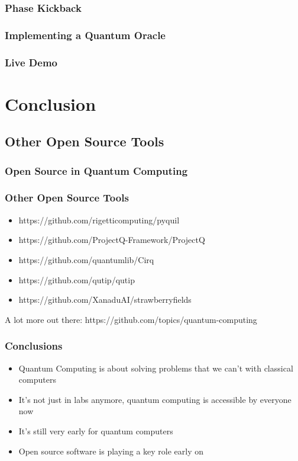 \documentclass[aspectratio=169,11pt,hyperref={colorlinks=true}]{beamer}
\begin{document}
\begin{frame}
    \frametitle{Phase Kickback}

\end{frame}

\begin{frame}
    \frametitle{Implementing a Quantum Oracle}

\end{frame}

\begin{frame}
    \frametitle{Live Demo}
\end{frame}


\section{Conclusion}
\subsection{Other Open Source Tools}
\begin{frame}
    \frametitle{Open Source in Quantum Computing}

\end{frame}

\begin{frame}
    \frametitle{Other Open Source Tools}
    \begin{itemize}
        \item https://github.com/rigetticomputing/pyquil
        \item https://github.com/ProjectQ-Framework/ProjectQ
        \item https://github.com/quantumlib/Cirq
        \item https://github.com/qutip/qutip
        \item https://github.com/XanaduAI/strawberryfields
    \end{itemize}
    A lot more out there:
    https://github.com/topics/quantum-computing
\end{frame}

\begin{frame}
    \frametitle{Conclusions}
    \begin{itemize}
        \item Quantum Computing is about solving problems that we can't with
            classical computers
        \item It's not just in labs anymore, quantum computing is accessible by
            everyone now
        \item It's still very early for quantum computers
        \item Open source software is playing a key role early on
    \end{itemize}
\end{frame}
\end{document}
